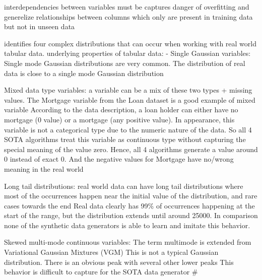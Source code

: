         interdependencies between variables must be captures \cite{lederrey2022DATGANIntegratingExperta}
        danger of overfitting and generelize relationships between columns which only are present in training data but not in unseen data \cite{lederrey2022DATGANIntegratingExperta}




        \cite{zhao2022CTABGANEnhancingTabular} identifies four complex distributions that can occur when working with real world tabular data.
        underlying properties of tabular data: \cite{zhao2022CTABGANEnhancingTabular}
        - Single Gaussian variables:
            Single mode Gaussian distributions are very common.
            The distribution of real data is close to a single mode Gaussian distribution
        
        Mixed data type variables:\cite{zhao2022CTABGANEnhancingTabular}
            a variable can be a mix of these two types + missing values. The Mortgage variable from the Loan dataset is a good example of mixed variable
            According to the data description, a loan holder can either have no mortgage (0 value) or a mortgage (any positive value). 
            In appearance, this variable is not a categorical type due to the numeric nature of the data. 
            So all 4 SOTA algorithms treat this variable as continuous type without capturing the special meaning of the value zero. 
            Hence, all 4 algorithms generate a value around 0 instead of exact 0. And the negative values for Mortgage have no/wrong meaning in the real world
        
        Long tail distributions:\cite{zhao2022CTABGANEnhancingTabular}
            real world data can have long tail distributions where most of the occurrences happen near the initial value of the distribution, and rare cases towards the end
            Real data clearly has 99\% of occurrences happening at the start of the range, 
            but the distribution extends until around 25000. 
            In comparison none of the synthetic data generators is able to learn and imitate this behavior.
        
        Skewed multi-mode continuous variables:\cite{zhao2022CTABGANEnhancingTabular}
            The term multimode is extended from Variational Gaussian Mixtures (VGM)
            This is not a typical Gaussian distribution. There is an obvious peak
            with several other lower peaks
            This behavior is difficult to capture for the SOTA data generator
        #

